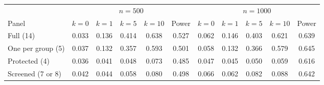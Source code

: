 \begin{tabular}{lcccccccccc}
\toprule
 & \multicolumn{5}{c}{$n=500$} & \multicolumn{5}{c}{$n=1000$} \\
\cmidrule(lr){2-6}\cmidrule(lr){7-11}
Panel & $k=0$ & $k=1$ & $k=5$ & $k=10$ & Power & $k=0$ & $k=1$ & $k=5$ & $k=10$ & Power \\
\midrule
Full (14) & 0.033 & 0.136 & 0.414 & 0.638 & 0.527 & 0.062 & 0.146 & 0.403 & 0.621 & 0.639 \\
One per group (5) & 0.037 & 0.132 & 0.357 & 0.593 & 0.501 & 0.058 & 0.132 & 0.366 & 0.579 & 0.645 \\
Protected (4) & 0.036 & 0.041 & 0.048 & 0.073 & 0.485 & 0.047 & 0.045 & 0.050 & 0.059 & 0.616 \\
Screened (7 or 8) & 0.042 & 0.044 & 0.058 & 0.080 & 0.498 & 0.066 & 0.062 & 0.082 & 0.088 & 0.642 \\
\bottomrule
\end{tabular}